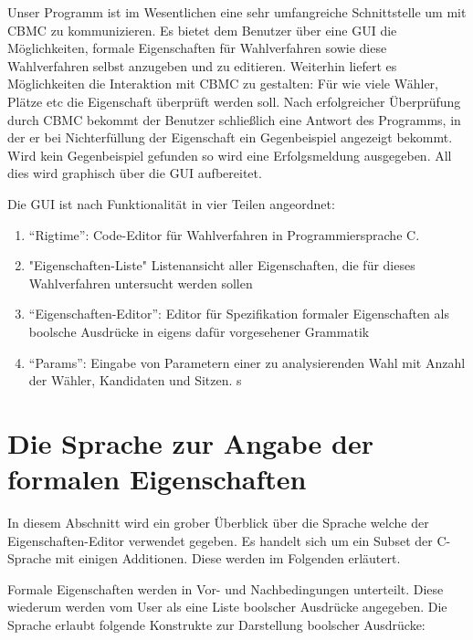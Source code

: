 \documentclass[a4paper]{scrreprt}
\begin{document}
Unser Programm ist im Wesentlichen eine sehr umfangreiche Schnittstelle um mit \ac{CBMC} zu kommunizieren. Es bietet dem Benutzer über eine \ac{GUI} die Möglichkeiten, formale Eigenschaften für Wahlverfahren sowie diese Wahlverfahren selbst anzugeben und zu editieren. Weiterhin liefert es Möglichkeiten die Interaktion mit \ac{CBMC} zu gestalten: Für wie viele Wähler, Plätze etc die Eigenschaft überprüft werden soll. Nach erfolgreicher Überprüfung durch \ac{CBMC} bekommt der Benutzer schließlich eine Antwort des Programms, in der er bei Nichterfüllung der Eigenschaft ein Gegenbeispiel angezeigt bekommt. Wird kein Gegenbeispiel gefunden so wird eine Erfolgsmeldung ausgegeben. All dies wird graphisch über die \ac{GUI} aufbereitet.

Die \ac{GUI} ist nach Funktionalität in vier Teilen angeordnet:
\begin{enumerate}
\item "`Rigtime"': Code-Editor für Wahlverfahren in Programmiersprache C.
\item "Eigenschaften-Liste" Listenansicht aller Eigenschaften, die für dieses Wahlverfahren untersucht werden sollen
\item "`Eigenschaften-Editor"': Editor für Spezifikation formaler Eigenschaften als boolsche Ausdrücke in eigens dafür vorgesehener Grammatik
\item "`Params"': Eingabe von Parametern einer zu analysierenden Wahl mit Anzahl der Wähler, Kandidaten und Sitzen. s
\end{enumerate}

\section{Die Sprache zur Angabe der formalen Eigenschaften}
In diesem Abschnitt wird ein grober Überblick über die Sprache welche der Eigenschaften-Editor verwendet gegeben. Es handelt sich um ein Subset der C-Sprache mit einigen Additionen. Diese werden im Folgenden erläutert. 

Formale Eigenschaften werden in Vor- und Nachbedingungen unterteilt. Diese wiederum werden vom User als eine Liste boolscher Ausdrücke angegeben. Die Sprache erlaubt folgende Konstrukte zur Darstellung boolscher Ausdrücke:
\end{document}
